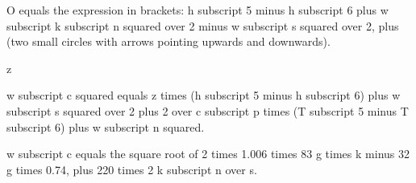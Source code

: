 O equals the expression in brackets: h subscript 5 minus h subscript 6 plus w subscript k subscript n squared over 2 minus w subscript s squared over 2, plus (two small circles with arrows pointing upwards and downwards).

z

w subscript c squared equals z times (h subscript 5 minus h subscript 6) plus w subscript s squared over 2 plus 2 over c subscript p times (T subscript 5 minus T subscript 6) plus w subscript n squared.

w subscript c equals the square root of 2 times 1.006 times 83 g times k minus 32 g times 0.74, plus 220 times 2 k subscript n over s.